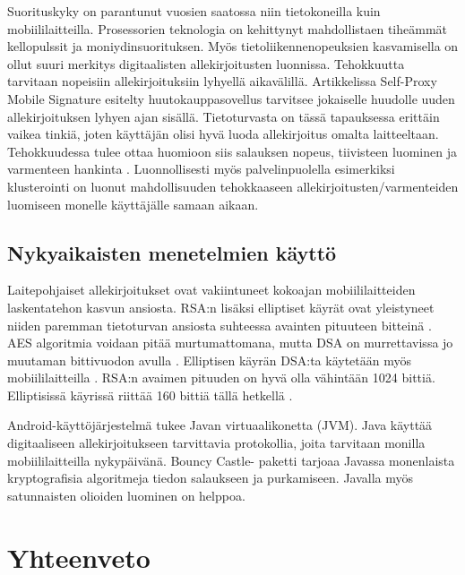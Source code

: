 \documentclass[finnish]{tktltiki2}
\theoremstyle{definition}
\theoremstyle{remark}
\begin{document}
Suorituskyky on parantunut vuosien saatossa niin tietokoneilla kuin mobiililaitteilla. Prosessorien teknologia on kehittynyt mahdollistaen tiheämmät kellopulssit ja moniydinsuorituksen. Myös tietoliikennenopeuksien kasvamisella on ollut suuri merkitys digitaalisten allekirjoitusten luonnissa. Tehokkuutta tarvitaan nopeisiin allekirjoituksiin lyhyellä aikavälillä. Artikkelissa Self-Proxy Mobile Signature \cite{proxy} esitelty huutokauppasovellus tarvitsee jokaiselle huudolle uuden  allekirjoituksen lyhyen ajan sisällä. Tietoturvasta on tässä tapauksessa erittäin vaikea tinkiä, joten käyttäjän olisi hyvä luoda allekirjoitus omalta laitteeltaan. Tehokkuudessa tulee ottaa huomioon siis salauksen nopeus, tiivisteen luominen ja varmenteen hankinta \cite{proxy}. Luonnollisesti myös palvelinpuolella esimerkiksi klusterointi on luonut mahdollisuuden tehokkaaseen allekirjoitusten/varmenteiden luomiseen monelle käyttäjälle samaan aikaan.

\subsection{Nykyaikaisten menetelmien käyttö}

Laitepohjaiset allekirjoitukset ovat vakiintuneet kokoajan mobiililaitteiden laskentatehon kasvun ansiosta. RSA:n lisäksi elliptiset käyrät ovat yleistyneet niiden paremman tietoturvan ansiosta suhteessa avainten pituuteen bitteinä \cite{ECC}. AES algoritmia voidaan pitää murtumattomana, mutta DSA on murrettavissa jo muutaman bittivuodon avulla \cite{gsm}. Elliptisen käyrän DSA:ta käytetään myös mobiililaitteilla \cite{webs}. RSA:n avaimen pituuden on hyvä olla vähintään 1024 bittiä. Elliptisissä käyrissä riittää 160 bittiä tällä hetkellä \cite{ECC}.

Android-käyttöjärjestelmä tukee Javan virtuaalikonetta (JVM). Java käyttää digitaaliseen allekirjoitukseen tarvittavia protokollia, joita tarvitaan monilla mobiililaitteilla nykypäivänä. Bouncy Castle- paketti tarjoaa Javassa monenlaista kryptografisia algoritmeja tiedon salaukseen ja purkamiseen. Javalla myös satunnaisten olioiden luominen on helppoa. \cite{enti}   

\section{Yhteenveto}  
\end{document}
